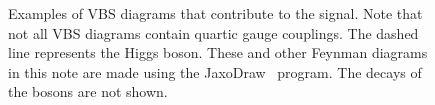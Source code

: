 %
\begin{figure}[tbp]
\begin{center}
\caption{
Examples of VBS diagrams that contribute to the signal.  Note that not all VBS diagrams contain quartic gauge couplings.
The dashed line represents the Higgs boson.  These and other Feynman diagrams in this note are made
using the JaxoDraw~\cite{Binosi:2003yf} program. The decays of the bosons are not shown.
}
\label{fig:feynmanVBS}
\end{center}
\end{figure}

